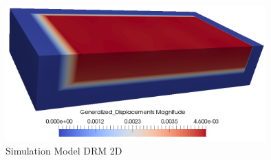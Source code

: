 \begin{figure}[H]
  \centering
  \includegraphics[width = 10cm]{./Figure-files/Day1/Preprocess_examples_with_Gmsh/example4/DRM3D_results.png}
  \caption{Simulation Model DRM 2D}
  \label{fig_day2_DRM3D_results}
\end{figure}





